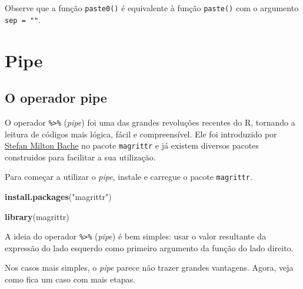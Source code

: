 \documentclass[
]{book}
\newenvironment{Shaded}{\begin{snugshade}}{\end{snugshade}}
\newcommand{\CommentTok}[1]{\textcolor[rgb]{0.56,0.35,0.01}{\textit{#1}}}
\newcommand{\KeywordTok}[1]{\textcolor[rgb]{0.13,0.29,0.53}{\textbf{#1}}}
\newcommand{\NormalTok}[1]{#1}
\newcommand{\OperatorTok}[1]{\textcolor[rgb]{0.81,0.36,0.00}{\textbf{#1}}}
\newcommand{\StringTok}[1]{\textcolor[rgb]{0.31,0.60,0.02}{#1}}
\begin{document}
Observe que a função \texttt{paste0()} é equivalente à função \texttt{paste()} com o argumento \texttt{sep\ =\ ""}.

\hypertarget{pipe}{%
\chapter{Pipe}\label{pipe}}

\hypertarget{o-operador-pipe}{%
\section{O operador pipe}\label{o-operador-pipe}}

O operador \texttt{\%\textgreater{}\%} (\emph{pipe}) foi uma das grandes revoluções recentes do R, tornando a leitura de códigos mais lógica, fácil e compreensível. Ele foi introduzido por \href{https://github.com/smbache}{Stefan Milton Bache} no pacote \texttt{magrittr} e já existem diversos pacotes construidos para facilitar a sua utilizaçăo.

Para começar a utilizar o \emph{pipe}, instale e carregue o pacote \texttt{magrittr}.

\begin{Shaded}
\begin{Highlighting}[]
\KeywordTok{install.packages}\NormalTok{(}\StringTok{"magrittr"}\NormalTok{)}

\KeywordTok{library}\NormalTok{(magrittr)}
\end{Highlighting}
\end{Shaded}

A ideia do operador \texttt{\%\textgreater{}\%} (\emph{pipe}) é bem simples: usar o valor resultante da expressão do lado esquerdo como primeiro argumento da função do lado direito.

\begin{Shaded}
\end{Shaded}

Nos casos mais simples, o \emph{pipe} parece não trazer grandes vantagens. Agora, veja como fica um caso com mais etapas.
\end{document}
